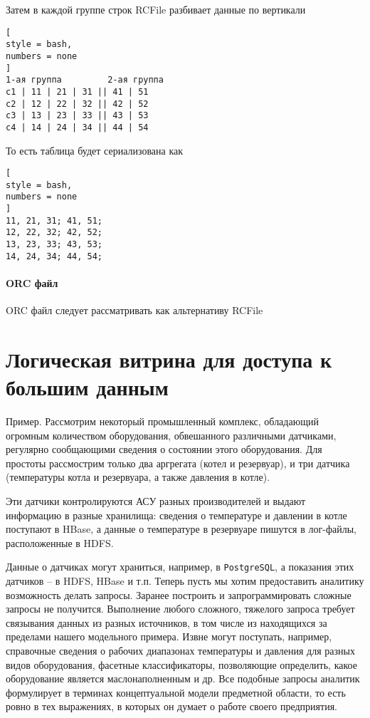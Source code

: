 \documentclass[%
	11pt,
	a4paper,
	utf8,
		]{article}
\begin{document}
Затем в каждой группе строк RCFile разбивает данные по вертикали
\begin{lstlisting}[
style = bash,
numbers = none	
]
1-ая группа         2-ая группа
с1 | 11 | 21 | 31 || 41 | 51
c2 | 12 | 22 | 32 || 42 | 52
c3 | 13 | 23 | 33 || 43 | 53
c4 | 14 | 24 | 34 || 44 | 54
\end{lstlisting}

То есть таблица будет сериализована как
\begin{lstlisting}[
style = bash,
numbers = none	
]
11, 21, 31; 41, 51;
12, 22, 32; 42, 52;
13, 23, 33; 43, 53;
14, 24, 34; 44, 54;
\end{lstlisting}

\paragraph{ORC файл} ORC файл следует рассматривать как альтернативу RCFile


\section{Логическая витрина для доступа к большим данным}

Пример. Рассмотрим некоторый промышленный комплекс, обладающий огромным количеством оборудования, обвешанного различными датчиками, регулярно сообщающими сведения о состоянии этого оборудования. Для простоты рассмострим только два аргрегата (котел и резервуар), и три датчика (температуры котла и резервуара, а также давления в котле).

Эти датчики контролируются АСУ разных производителей и выдают информацию в разные хранилища: сведения о температуре и давлении в котле поступают в HBase, а данные о температуре в резервуаре пишутся в лог-файлы, расположенные в HDFS.

Данные о датчиках могут храниться, например, в \texttt{PostgreSQL}, а показания этих датчиков -- в HDFS, HBase и т.п. Теперь пусть мы хотим предоставить аналитику возможность делать запросы. Заранее построить и запрограммировать сложные запросы не получится. Выполнение любого сложного, тяжелого запроса требует связывания данных из разных источников, в том числе из находящихся за пределами нашего модельного примера. Извне могут поступать, например, справочные сведения о рабочих диапазонах температуры и давления для разных видов оборудования, фасетные классификаторы, позволяющие определить, какое оборудование является маслонаполненным и др. Все подобные запросы аналитик формулирует в терминах концептуальной модели предметной области, то есть ровно в тех выражениях, в которых он думает о работе своего предприятия.
\end{document}
